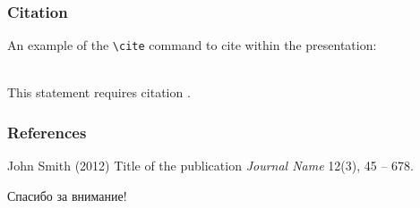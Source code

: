 \documentclass{beamer}
\begin{document}

\begin{frame}[fragile] %
\frametitle{Citation}
An example of the \verb|\cite| command to cite within the presentation:\\~

This statement requires citation \cite{p1}.
\end{frame}


\begin{frame}
\frametitle{References}
\footnotesize{
\begin{thebibliography}{99} %
 John Smith (2012)
\newblock Title of the publication
\newblock \emph{Journal Name} 12(3), 45 -- 678.
\end{thebibliography}
}
\end{frame}


\begin{frame}
\Huge{\centerline{Спасибо за внимание!}}
\end{frame}

\end{document}
